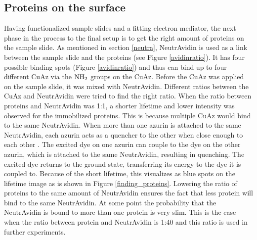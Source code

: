 \documentclass[twoside,single]{lion-msc}
\begin{document}
\subsection{Proteins on the surface}
Having functionalized sample slides and a fitting electron mediator, the next phase in the process to the final setup is to get the right amount of proteins on the sample slide. As mentioned in section \ref{neutra},  NeutrAvidin is used as a link between the sample slide and the proteins (see Figure \ref{avidinratio}). It has four possible binding spots  (Figure \ref{avidinratio}) and thus can bind up to four different CuAz via the $\textup{NH}_{2}$ groups on the CuAz.  Before the CuAz was applied on the sample slide, it was mixed with NeutrAvidin. Different ratios between the CuAz and NeutrAvidin were tried to find the right ratio. When the ratio between proteins and NeutrAvidin was 1:1, a shorter lifetime and lower intensity was observed for the immobilized proteins. This is because multiple CuAz would bind to the same NeutrAvidin. When more than one azurin is attached to the same NeutrAvidin, each azurin acts as a quencher to the other when close enough to each other \cite{Lakowicz2006}. The excited dye on one azurin can couple to the dye on the other azurin, which is attached to the same NeutrAvidin, resulting in quenching. The excited dye returns to the ground state, transferring its energy to the dye it is coupled to. Because of the short lifetime, this visualizes as blue spots on the lifetime image as is shown in Figure \ref{finding_proteins}. Lowering the ratio of proteins to the same amount of NeutrAvidin ensures the fact that less protein will bind to the same NeutrAvidin. At some point the probability that the NeutrAvidin is bound to more than one protein is very slim. This is the case when the ratio between protein and NeutrAvidin is 1:40 and this ratio is used in further experiments.
\end{document}

